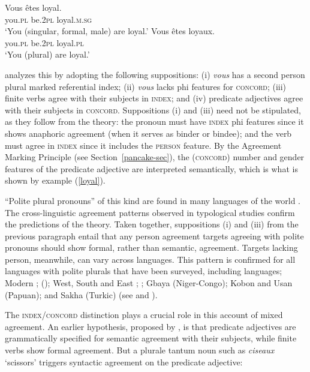 \documentclass[output=paper
	        ,collection
	        ,collectionchapter
 	        ,biblatex
                ,babelshorthands
                ,newtxmath
                ,draftmode
                ,colorlinks, citecolor=brown
]{langscibook}
\begin{document}
\begin{exe} 
\ex\label{loyal}
\begin{xlist}
\ex
\gll   Vous		\^{e}tes		loyal. \\
		you.\textsc{pl}		be.\textsc{2pl}	loyal.\textsc{m.sg} \\
\glt		`You (singular, formal, male) are loyal.’ 
\ex 
\gll	Vous		\^{e}tes		loyaux. \\
		you.\textsc{pl}		be.\textsc{2pl}	loyal.\textsc{pl} \\
\glt		`You (plural) are loyal.’  
\end{xlist}
\end{exe}

\noindent
\citet{Wechsler:2011} analyzes this by adopting the following suppositions: (i) \textit{vous} has a  second person plural marked referential index; (ii) \textit{vous} lacks phi features for \textsc{concord}; (iii) finite verbs agree with their subjects in \textsc{index}; and (iv) predicate adjectives agree with their subjects in \textsc{concord}.  Suppositions (i) and (iii) need not be stipulated, as they follow from the theory:  the pronoun must have \textsc{index} phi features since it shows anaphoric agreement (when it serves as binder or bindee); and the verb must agree in \textsc{index} since it includes the \textsc{person} feature.  By the Agreement Marking Principle (see Section~\ref{pancake-sec}), the (\textsc{concord}) number and gender features of the predicate adjective are interpreted semantically, which is what is shown by example (\ref{loyal}). 

``Polite plural pronouns'' of this kind are found in many languages of the world \citep{Head:1978}.   The cross-linguistic agreement patterns observed in typological studies \citep{Comrie:1975,Wechsler:2011} confirm the predictions of the theory.  Taken together, suppositions (i) and (iii) from the previous paragraph entail that any person agreement targets agreeing with polite pronouns should show formal, rather than semantic, agreement.  Targets lacking person, meanwhile, can vary across languages.  This pattern is confirmed for all languages with polite plurals that have been surveyed, including  languages; Modern ;  (); West, South and East ; ; Gbaya (Niger-Congo);  Kobon and Usan (Papuan); and Sakha (Turkic) (see \citealt{Comrie:1975} and \citealt{Wechsler:2011}).   
 
The \textsc{index/concord} distinction plays a crucial role in this account of mixed agreement.  An earlier hypothesis, proposed by \citet{Kathol99b}, is that  predicate adjectives are grammatically specified for semantic  agreement with their subjects, while finite verbs show formal agreement.  But a plurale tantum noun such as \textit{ciseaux} `scissors’ triggers syntactic agreement on the predicate adjective:
	
\end{document}

